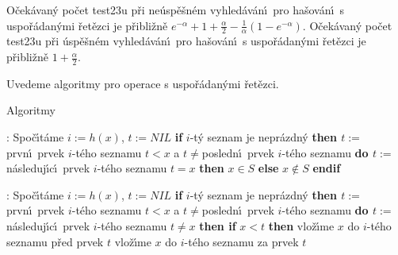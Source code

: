 O\v cek\'avan\'y po\v cet test\accent23u p\v ri 
ne\'usp\v e\v sn\'em vyhled\'av\'an\'\i\ pro ha\v sov\'an\'\i\ s uspo\v r\'a\-dan\'ymi 
\v ret\v ezci je p\v ribli\v zn\v e $e^{-\alpha}+1+\frac {\alpha}
2-\frac 1{\alpha}\left(1-e^{-\alpha}\right)$. O\v cek\'avan\'y 
po\v cet test\accent23u p\v ri \'usp\v e\v sn\'em vyhled\'av\'an\'\i\ pro 
ha\v sov\'an\'\i\ s uspo\v r\'adan\'ymi \v ret\v ezci je 
p\v ribli\v zn\v e $1+\frac {\alpha}2.$
\endproclaim

\flushpar Uvedeme algoritmy pro operace s uspo\v r\'adan\'ymi 
\v re\-t\v ez\-ci.
\medskip

\subhead
Algoritmy
\endsubhead
\smallskip

:\newline 
Spo\v c\'\i t\'ame $i:=h\left(x\right)$, $t:=NIL$\newline 
{\bf if} $i$-t\'y seznam je nepr\'azdn\'y {\bf then\newline 
\phantom{{\rm ---}}$t:=$}prvn\'\i\ prvek $i$-t\'eho seznamu\newline 
\phantom{---}{\bf while} $t<x$ a $t\ne$posledn\'\i\ prvek $i$-t\'eho seznamu {\bf do\newline 
\phantom{{\rm ------}}$t:=$}n\'asleduj\'\i c\'\i\ prvek $i$-t\'eho seznamu\newline
\phantom{---}{\bf enddo\newline 
endif \newline 
if} $t=x$ {\bf then} $x\in S$ {\bf else} $x\notin S$ {\bf endif}
\medskip

:\newline 
Spo\v c\'\i t\'ame $i:=h\left(x\right)$, $t:=NIL$\newline 
{\bf if} $i$-t\'y seznam je nepr\'azdn\'y {\bf then\newline 
\phantom{{\rm ---}}$t:=$}prvn\'\i\ prvek $i$-t\'eho seznamu\newline 
\phantom{---}{\bf while} $t<x$ a $t\ne$posledn\'\i\ prvek $i$-t\'eho seznamu {\bf do\newline 
\phantom{{\rm ------}}$t:=$}n\'asleduj\'\i c\'\i\ prvek $i$-t\'eho seznamu\newline 
\phantom{---}{\bf enddo\newline 
endif \newline 
if} $t\ne x$ {\bf then\newline 
\phantom{{\rm ---}}if} $x<t$ {\bf then\newline 
\phantom{{\rm ------}}}vlo\v z\'\i me $x$ do $i$-t\'eho seznamu p\v red prvek $
t$\newline 
\phantom{---}{\bf else\newline} 
\phantom{------}vlo\v z\'\i me $x$ do $i$-t\'eho seznamu za prvek $
t$\newline 
\phantom{---}{\bf endif\newline 
endif}
\medskip

